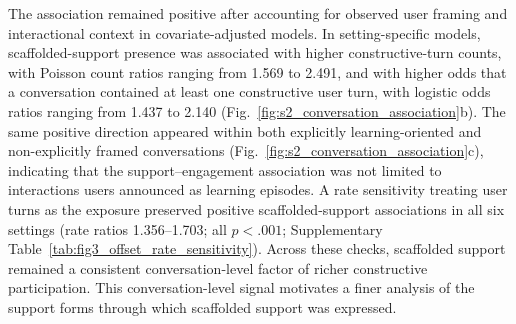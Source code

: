 The association remained positive after accounting for observed user framing and interactional context in covariate-adjusted models. In setting-specific models, scaffolded-support presence was associated with higher constructive-turn counts, with Poisson count ratios ranging from 1.569 to 2.491, and with higher odds that a conversation contained at least one constructive user turn, with logistic odds ratios ranging from 1.437 to 2.140 (Fig.~\ref{fig:s2_conversation_association}b). The same positive direction appeared within both explicitly learning-oriented and non-explicitly framed conversations (Fig.~\ref{fig:s2_conversation_association}c), indicating that the support--engagement association was not limited to interactions users announced as learning episodes. A rate sensitivity treating user turns as the exposure preserved positive scaffolded-support associations in all six settings (rate ratios 1.356--1.703; all $p<.001$; Supplementary Table~\ref{tab:fig3_offset_rate_sensitivity}). Across these checks, scaffolded support remained a consistent conversation-level factor of richer constructive participation. This conversation-level signal motivates a finer analysis of the support forms through which scaffolded support was expressed.





